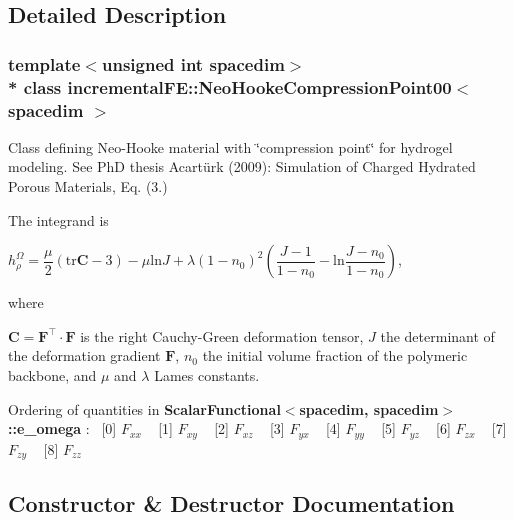 \subsection{Detailed Description}
\subsubsection*{template$<$unsigned int spacedim$>$\\*
class incremental\+F\+E\+::\+Neo\+Hooke\+Compression\+Point00$<$ spacedim $>$}

Class defining Neo-\/\+Hooke material with \char`\"{}compression point\char`\"{} for hydrogel modeling. See PhD thesis Acartürk (2009)\+: Simulation of Charged Hydrated Porous Materials, Eq. (3.)

The integrand is

$h^\Omega_\rho = \dfrac{\mu}{2} ( \mathrm{tr}\boldsymbol{C} - 3 ) - \mu \mathrm{ln}J + \lambda (1-n_0)^2 \left( \dfrac{J-1}{1-n_0} - \mathrm{ln}\dfrac{J-n_0}{1-n_0} \right) $,

where

$ \boldsymbol{C} =\boldsymbol{F}^\top \cdot \boldsymbol{F} $ is the right Cauchy-\/\+Green deformation tensor, $J$ the determinant of the deformation gradient $\boldsymbol{F}$, $n_0$ the initial volume fraction of the polymeric backbone, and $\mu$ and $\lambda$ Lame\textquotesingle{}s constants.

Ordering of quantities in {\bf Scalar\+Functional$<$spacedim, spacedim$>$\+::e\+\_\+omega} \+:~\newline
 \mbox{[}0\mbox{]} $F_{xx}$ ~\newline
 \mbox{[}1\mbox{]} $F_{xy}$ ~\newline
 \mbox{[}2\mbox{]} $F_{xz}$ ~\newline
 \mbox{[}3\mbox{]} $F_{yx}$ ~\newline
 \mbox{[}4\mbox{]} $F_{yy}$ ~\newline
 \mbox{[}5\mbox{]} $F_{yz}$ ~\newline
 \mbox{[}6\mbox{]} $F_{zx}$ ~\newline
 \mbox{[}7\mbox{]} $F_{zy}$ ~\newline
 \mbox{[}8\mbox{]} $F_{zz}$ ~\newline
 

\subsection{Constructor \& Destructor Documentation}
